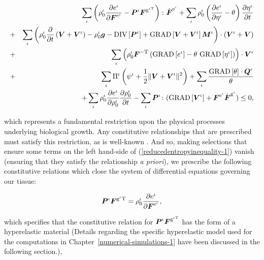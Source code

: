 \begin{eqnarray}
& &\sum\limits_{\iota}\left(\rho_{0}^{\iota}\frac{\partial
    e^\iota}{\partial\mbox{\boldmath$ F$}^{\mathrm{e}^\iota}} -
  \mbox{\boldmath$ P$}^\iota\mbox{\boldmath$ F$}^{\mathrm{g}^{\iota\mathrm{T}}}\right)
  \colon\dot{\mbox{\boldmath$ F$}}^{\mathrm{e}^\iota} +
  \sum\limits_{\iota}\rho_{0}^{\iota}\left(\frac{\partial
    e^\iota}{\partial
    \eta^\iota}-\theta\right)\frac{\partial\eta^\iota}{\partial
    t}\nonumber\\ &+&\sum\limits_{\iota}
  \left(\rho^\iota_0\frac{\partial}{\partial
    t}\left(\mbox{\boldmath$ V$}+\mbox{\boldmath$ V$}^\iota\right) - \rho_0^\iota\mbox{\boldmath$ g$} -
  \mathrm{DIV}\left[\mbox{\boldmath$ P$}^\iota\right] +
  \mathrm{GRAD}\left[\mbox{\boldmath$ V$}+\mbox{\boldmath$ V$}^\iota\right]\mbox{\boldmath$ M$}^\iota\right)
  \cdot(\mbox{\boldmath$ V$}^\iota+\mbox{\boldmath$ V$})\nonumber\\ &+&
  \sum\limits_{\iota}\left(\rho^\iota_0\mbox{\boldmath$ F$}^{-\mathrm{T}}  
  \left(\mathrm{GRAD}\left[e^\iota\right] -
    \theta\ \mathrm{GRAD}\left[\eta^\iota\right]\right)
    \right)\cdot\mbox{\boldmath$ V$}^\iota\nonumber\\  
    &+&\sum\limits_{\iota}\Pi^\iota\left(\psi^\iota
    + \frac{1}{2}\Vert\mbox{\boldmath$ V$}+\mbox{\boldmath$ V$}^\iota\Vert^2\right) +
    \sum\limits_{\iota} \frac{\mathrm{GRAD}\left[\theta\right]
      \cdot\mbox{\boldmath$ Q$}^\iota}{\theta}\nonumber\\  &  & + 
    \sum\limits_{\iota}\rho^\iota_0\frac{\partial
      e^\iota}{\partial\rho^\iota_0}\frac{\partial
      \rho^\iota_0}{\partial t} -
    \sum\limits_{\iota}\mbox{\boldmath$ P$}^\iota
    \colon(\mathrm{GRAD}\left[\mbox{\boldmath$ V$}^\iota\right] + 
    \mbox{\boldmath$ F$}^{\mathrm{e}^\iota}\dot{\mbox{\boldmath$ F$}}^{\mathrm{g}^\iota}) \leq 0,
\label{reducedentropyinequality-1}
\end{eqnarray}

\noindent which represents a fundamental restriction upon the physical
processes underlying biological growth. Any constitutive relationships
that are prescribed must satisfy this restriction, as is well-known
\citep{TruesdellToupin:60}. And so, making selections that ensure some
terms on the left hand-side of (\ref{reducedentropyinequality-1})
vanish (ensuring that they satisfy the relationship {\em a priori}),
we prescribe the following constitutive relations which close the
system of differential equations governing our tissue:

\begin{equation}
\mbox{\boldmath$ P$}^\iota\mbox{\boldmath$ F$}^{\mathrm{g}^\iota\mathrm{T}} = \rho_0^\iota
\frac{\partial e^\iota}{\partial\mbox{\boldmath$ F$}^{\mathrm{e}^\iota}},
\label{constitutive-relation-hyperelasticity}
\end{equation}

\noindent which specifies that the constitutive relation for
$\mbox{\boldmath$ P$}^\iota\mbox{\boldmath$ F$}^{\mathrm{g}^{\iota\mathrm{T}}}$ has the form of a
hyperelastic material (Details regarding the specific hyperelastic
model used for the computations in
Chapter~\ref{numerical-simulations-1} have been discussed in the
following section.),

